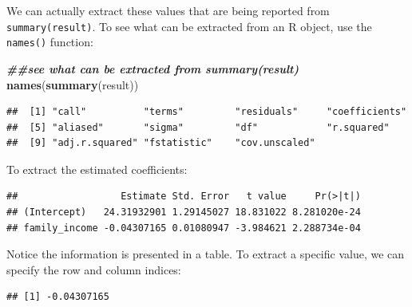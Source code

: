 \documentclass[
]{book}
\newenvironment{Shaded}{\begin{snugshade}}{\end{snugshade}}
\newcommand{\DecValTok}[1]{\textcolor[rgb]{0.00,0.00,0.81}{#1}}
\newcommand{\DocumentationTok}[1]{\textcolor[rgb]{0.56,0.35,0.01}{\textbf{\textit{#1}}}}
\newcommand{\FunctionTok}[1]{\textcolor[rgb]{0.13,0.29,0.53}{\textbf{#1}}}
\newcommand{\NormalTok}[1]{#1}
\newcommand{\SpecialCharTok}[1]{\textcolor[rgb]{0.81,0.36,0.00}{\textbf{#1}}}
\begin{document}
We can actually extract these values that are being reported from \texttt{summary(result)}. To see what can be extracted from an R object, use the \texttt{names()} function:

\begin{Shaded}
\begin{Highlighting}[]
\DocumentationTok{\#\#see what can be extracted from summary(result)}
\FunctionTok{names}\NormalTok{(}\FunctionTok{summary}\NormalTok{(result))}
\end{Highlighting}
\end{Shaded}

\begin{verbatim}
##  [1] "call"          "terms"         "residuals"     "coefficients" 
##  [5] "aliased"       "sigma"         "df"            "r.squared"    
##  [9] "adj.r.squared" "fstatistic"    "cov.unscaled"
\end{verbatim}

To extract the estimated coefficients:

\begin{Shaded}
\end{Shaded}

\begin{verbatim}
##                  Estimate Std. Error   t value     Pr(>|t|)
## (Intercept)   24.31932901 1.29145027 18.831022 8.281020e-24
## family_income -0.04307165 0.01080947 -3.984621 2.288734e-04
\end{verbatim}

Notice the information is presented in a table. To extract a specific value, we can specify the row and column indices:

\begin{Shaded}
\end{Shaded}

\begin{verbatim}
## [1] -0.04307165
\end{verbatim}

\begin{Shaded}
\end{Shaded}
\end{document}
